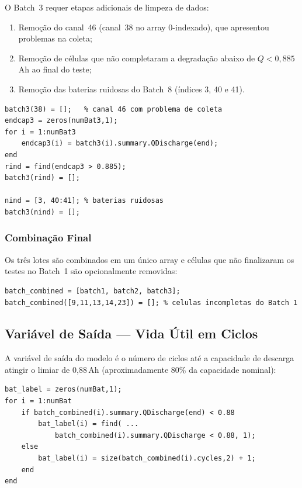 \documentclass[12pt,a4paper]{article}
\begin{document}
O Batch~3 requer etapas adicionais de limpeza de dados:

\begin{enumerate}
  \item Remo\c{c}\~ao do canal~46 (canal~38 no array 0-indexado), que apresentou
    problemas na coleta;
  \item Remo\c{c}\~ao de c\'{e}lulas que n\~ao completaram a degrada\c{c}\~ao abaixo de
    $Q < 0{,}885$\,Ah ao final do teste;
  \item Remo\c{c}\~ao das baterias ruidosas do Batch~8 (\'{i}ndices 3, 40 e 41).
\end{enumerate}

\begin{lstlisting}[style=matlab, caption={Filtragem do Batch 3}]
batch3(38) = [];   % canal 46 com problema de coleta
endcap3 = zeros(numBat3,1);
for i = 1:numBat3
    endcap3(i) = batch3(i).summary.QDischarge(end);
end
rind = find(endcap3 > 0.885);
batch3(rind) = [];

nind = [3, 40:41]; % baterias ruidosas
batch3(nind) = [];
\end{lstlisting}

\subsubsection{Combina\c{c}\~ao Final}

Os tr\^{e}s lotes s\~ao combinados em um \'{u}nico array e c\'{e}lulas que n\~ao finalizaram
os testes no Batch~1 s\~ao opcionalmente removidas:

\begin{lstlisting}[style=matlab, caption={Combina\c{c}\~ao dos lotes}]
batch_combined = [batch1, batch2, batch3];
batch_combined([9,11,13,14,23]) = []; % celulas incompletas do Batch 1
\end{lstlisting}

\subsection{Vari\'{a}vel de Sa\'{i}da --- Vida \'{U}til em Ciclos}

A vari\'{a}vel de sa\'{i}da do modelo \'{e} o n\'{u}mero de ciclos at\'{e} a capacidade de descarga
atingir o limiar de 0{,}88\,Ah (aproximadamente 80\% da capacidade nominal):

\begin{lstlisting}[style=matlab, caption={Extra\c{c}\~ao da vari\'{a}vel alvo}]
bat_label = zeros(numBat,1);
for i = 1:numBat
    if batch_combined(i).summary.QDischarge(end) < 0.88
        bat_label(i) = find( ...
            batch_combined(i).summary.QDischarge < 0.88, 1);
    else
        bat_label(i) = size(batch_combined(i).cycles,2) + 1;
    end
end
\end{lstlisting}
\end{document}
